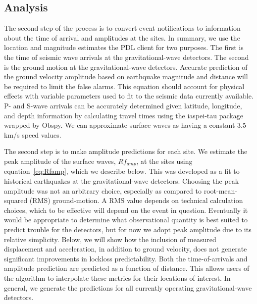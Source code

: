 \documentclass[reprint, prl, aps, showpacs]{revtex4-1}
\begin{document}
\subsection{Analysis}

The second step of the process is to convert event notifications to information about the time of arrival and amplitudes at the sites.
In summary, we use the location and magnitude estimates the PDL client for two purposes. 
The first is the time of seismic wave arrivals at the gravitational-wave detectors.
The second is the ground motion at the gravitational-wave detectors.
Accurate prediction of the ground velocity amplitude based on earthquake magnitude and distance will be required to limit the false alarms. 
This equation should account for physical effects with variable parameters used to fit to the seismic data currently available.
P- and S-wave arrivals can be accurately determined given latitude, longitude, and depth information by calculating travel times using the iaspei-tau package \cite{Snoke2009} wrapped by Obspy. We can approximate surface waves as having a constant 3.5\,km/s speed values. 

The second step is to make amplitude predictions for each site. 
We estimate the peak amplitude of the surface waves, $Rf_{amp}$, at the sites using equation~\ref{eq:Rfamp}, which we describe below. This was developed as a fit to historical earthquakes at the gravitational-wave detectors.
Choosing the peak amplitude was not an arbitrary choice, especially as compared to root-mean-squared (RMS) ground-motion.
A RMS value depends on technical calculation choices, which to be effective will depend on the event in question.
Eventually it would be appropriate to determine what observational quantity is best suited to predict trouble for the detectors, but for now we adopt peak amplitude due to its relative simplicity.
Below, we will show how the inclusion of measured displacement and acceleration, in addition to ground velocity, does not generate significant improvements in lockloss predictability.
Both the time-of-arrivals and amplitude prediction are predicted as a function of distance. This allows users of the algorithm to interpolate these metrics for their locations of interest. In general, we generate the predictions for all currently operating gravitational-wave detectors.
\end{document}
